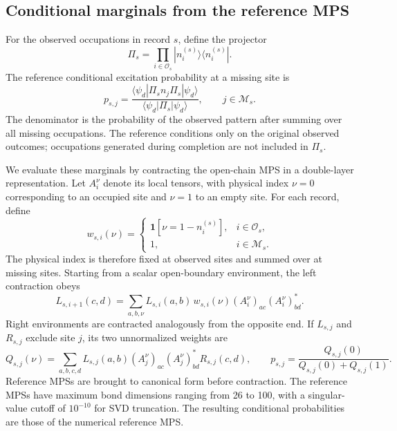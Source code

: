 \documentclass[11pt,a4paper]{article}
\newcommand{\ind}{\mathbf{1}}
\newcommand{\subhead}[1]{\subsection*{#1}}
\begin{document}
\subhead{Conditional marginals from the reference MPS}
For the observed occupations in record $s$, define the projector
\begin{equation}
\Pi_s
=
\prod_{i\in\mathcal{O}_s}
|n_i^{(s)}\rangle\langle n_i^{(s)}|.
\end{equation}
The reference conditional excitation probability at a missing site is
\begin{equation}
p_{s,j}
=
\frac{
\langle\psi_d|\Pi_s n_j\Pi_s|\psi_d\rangle
}{
\langle\psi_d|\Pi_s|\psi_d\rangle
},
\qquad j\in\mathcal{M}_s.
\label{supp:eq:ryd_conditional}
\end{equation}
The denominator is the probability of the observed pattern after
summing over all missing occupations. The reference conditions only
on the original observed outcomes; occupations generated during
completion are not included in $\Pi_s$.

We evaluate these marginals by contracting the open-chain MPS in
a double-layer representation. Let $A_i^\nu$ denote its local
tensors, with physical index $\nu=0$ corresponding to an occupied
site and $\nu=1$ to an empty site. For each record, define
\begin{equation}
w_{s,i}(\nu)
=
\begin{cases}
\ind[\nu=1-n_i^{(s)}], & i\in\mathcal{O}_s,\\
1, & i\in\mathcal{M}_s.
\end{cases}
\label{supp:eq:mps_allowed}
\end{equation}
The physical index is therefore fixed at observed sites and summed
over at missing sites. Starting from a scalar open-boundary
environment, the left contraction obeys
\begin{equation}
L_{s,i+1}(c,d)
=
\sum_{a,b,\nu}
L_{s,i}(a,b)\,w_{s,i}(\nu)
(A_i^\nu)_{ac}(A_i^\nu)_{bd}^{*}.
\label{supp:eq:mps_left}
\end{equation}
Right environments are contracted analogously from the opposite end.
If $L_{s,j}$ and $R_{s,j}$ exclude site $j$, its two unnormalized
weights are
\begin{equation}
Q_{s,j}(\nu)
=
\sum_{a,b,c,d}
L_{s,j}(a,b)
(A_j^\nu)_{ac}(A_j^\nu)_{bd}^{*}
R_{s,j}(c,d),
\qquad
p_{s,j}
=
\frac{Q_{s,j}(0)}
{Q_{s,j}(0)+Q_{s,j}(1)}.
\label{supp:eq:mps_probability}
\end{equation}
Reference MPSs are brought to canonical form
before contraction. The reference MPSs have maximum bond dimensions ranging from 26 to 100, with a singular-value cutoff of $10^{-10}$ for SVD
truncation. The resulting conditional probabilities are those of the numerical reference MPS.
\end{document}
